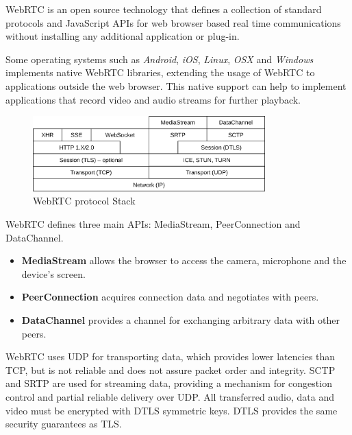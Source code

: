 \ac{WebRTC} is an open source technology that defines a collection of standard protocols and JavaScript \ac{API}s for web browser based real time communications without installing any additional application or plug-in. 

Some operating systems such as \emph{Android}, \emph{iOS}, \emph{Linux}, \emph{OSX} and \emph{Windows} implements native \ac{WebRTC} libraries, extending the usage of \ac{WebRTC} to applications outside the web browser. This native support can help to implement applications that record video and audio streams for further playback.


\begin{figure}[H]
	\centering
	\includegraphics[width=0.8\textwidth]{figures/webrtc_stack.png}
	\caption{WebRTC protocol Stack}
\end{figure}

\ac{WebRTC} defines three main \ac{API}s: MediaStream, PeerConnection and DataChannel. 

\begin{itemize}
  \item \textbf{MediaStream} allows the browser to access the camera, microphone and the device's screen. 

  \item \textbf{PeerConnection} acquires connection data and negotiates with peers.
  \item \textbf{DataChannel} provides a channel for exchanging arbitrary data with other peers.
\end{itemize}

\ac{WebRTC} uses \ac{UDP} for transporting data, which provides lower latencies than \ac{TCP}, but is not reliable and does not assure packet order and integrity. \ac{SCTP} and \ac{SRTP} are used for streaming data, providing a mechanism for congestion control and partial reliable delivery over \ac{UDP}. All transferred audio, data and video must be encrypted with \ac{DTLS} symmetric keys. \ac{DTLS} provides the same security guarantees as \ac{TLS}. 

